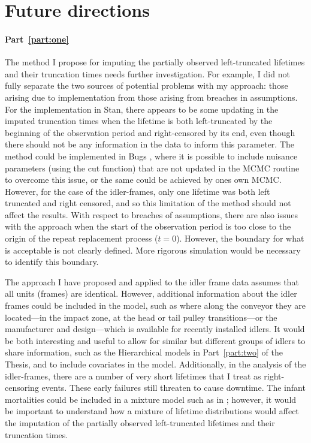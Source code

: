 \section{Future directions} \label{sec:Thesis-future-work}

\paragraph*{Part~\ref{part:one}} The method I propose for imputing the partially observed left-truncated lifetimes and their truncation times needs further investigation. For example, I did not fully separate the two sources of potential problems with my approach: those arising due to implementation from those arising from breaches in assumptions. For the implementation in Stan, there appears to be some updating in the imputed truncation times when the lifetime is both left-truncated by the beginning of the observation period and right-censored by its end, even though there should not be any information in the data to inform this parameter. The method could be implemented in Bugs \citep{lunn2012}, where it is possible to include nuisance parameters (using the cut function) that are not updated in the MCMC routine to overcome this issue, or the same could be achieved by ones own MCMC. However, for the case of the idler-frames, only one lifetime was both left truncated and right censored, and so this limitation of the method should not affect the results. With respect to breaches of assumptions, there are also issues with the approach when the start of the observation period is too close to the origin of the repeat replacement process ($t = 0$). However, the boundary for what is acceptable is not clearly defined. More rigorous simulation would be necessary to identify this boundary.

The approach I have proposed and applied to the idler frame data assumes that all units (frames) are identical. However, additional information about the idler frames could be included in the model, such as where along the conveyor they are located---in the impact zone, at the head or tail pulley transitions---or the manufacturer and design---which is available for recently installed idlers. It would be both interesting and useful to allow for similar but different groups of idlers to share information, such as the Hierarchical models in Part~\ref{part:two} of the Thesis, and to include covariates in the model. Additionally, in the analysis of the idler-frames, there are a number of very short lifetimes that I treat as right-censoring events. These early failures still threaten to cause downtime. The infant mortalities could be included in a mixture model such as in \citet{mittman2013}; however, it would be important to understand how a mixture of lifetime distributions would affect the imputation of the partially observed left-truncated lifetimes and their truncation times.

